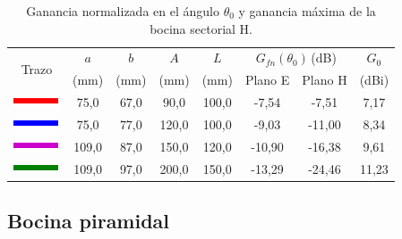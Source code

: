 \begin{table}[H]
\centering
\begin{tabular}{|c|c|c|c|c|c|c|c|}
\hline
\multirow{2}{*}{Trazo} & $a$ & $b$ & $A$ & $L$ & \multicolumn{2}{c|}{$G_{fn}\left(\theta_0\right)\,$(dB)} & $G_0$ \\
\cline{6-7}
& (mm) & (mm) & (mm) & (mm) & Plano E & Plano H & (dBi)\\
\hline
\includegraphics[scale = 1]{Figures/Estudio/linea_tabla_rojo} & 75,0 & 67,0 & 90,0 & 100,0 & -7,54 & -7,51 & 7,17 \\
\hline
\includegraphics[scale = 1]{Figures/Estudio/linea_tabla_azul} & 75,0 & 77,0 & 120,0 & 100,0 & -9,03 & -11,00 & 8,34 \\
\hline
\includegraphics[scale = 1]{Figures/Estudio/linea_tabla_violeta} & 109,0 & 87,0 & 150,0 & 120,0 & -10,90 & -16,38 & 9,61 \\
\hline
\includegraphics[scale = 1]{Figures/Estudio/linea_tabla_verde} & 109,0 & 97,0 & 200,0 & 150,0 & -13,29 & -24,46 & 11,23 \\
\hline
\end{tabular}
\caption{Ganancia normalizada en el ángulo $\theta_0$ y ganancia máxima de la bocina sectorial H.}
\label{tabla_estudio:8}
\end{table}

\subsection{Bocina piramidal}
\label{subsec_estudio_boci_pira}

